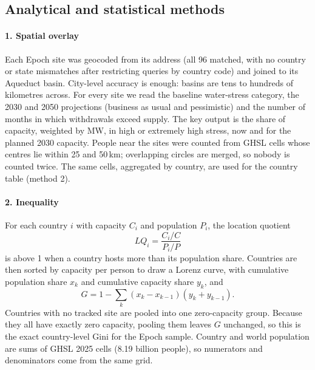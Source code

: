 \subsection{Analytical and statistical methods}

\paragraph{1. Spatial overlay} Each Epoch site was geocoded from its address (all 96 matched, with no country or
state mismatches after restricting queries by country code) and joined to its Aqueduct basin. City-level accuracy is
enough: basins are tens to hundreds of kilometres across. For every site we read the baseline water-stress category,
the 2030 and 2050 projections (business as usual and pessimistic) and the number of months in which withdrawals exceed
supply. The key output is the share of capacity, weighted by MW, in high or extremely high stress, now and for the
planned 2030 capacity. People near the sites were counted from GHSL cells whose centres lie within 25 and 50\,km;
overlapping circles are merged, so nobody is counted twice. The same cells, aggregated by country, are used for the
country table (method 2).

\paragraph{2. Inequality} For each country $i$ with capacity $C_i$ and population $P_i$, the location quotient
\begin{equation}
LQ_i = \frac{C_i / C}{P_i / P}
\end{equation}
is above 1 when a country hosts more than its population share. Countries are then sorted by capacity per person to
draw a Lorenz curve, with cumulative population share $x_k$ and cumulative capacity share $y_k$, and
\begin{equation}
G = 1 - \textstyle\sum_k (x_k - x_{k-1})(y_k + y_{k-1}).
\end{equation}
Countries with no tracked site are pooled into one zero-capacity group. Because they all have exactly zero capacity,
pooling them leaves $G$ unchanged, so this is the exact country-level Gini for the Epoch sample. Country and world
population are sums of GHSL 2025 cells (8.19 billion people), so numerators and denominators come from the same grid.

